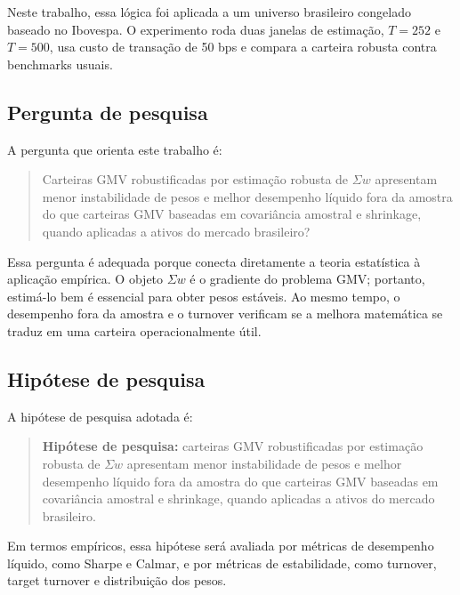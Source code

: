 \documentclass[12pt,a4paper]{article}
\begin{document}
\begin{center}
\end{center}

Neste trabalho, essa lógica foi aplicada a um universo brasileiro congelado baseado no
Ibovespa. O experimento roda duas janelas de estimação, $T=252$ e $T=500$, usa custo de
transação de 50 bps e compara a carteira robusta contra benchmarks usuais.

\subsection{Pergunta de pesquisa}

A pergunta que orienta este trabalho é:

\begin{quote}
Carteiras GMV robustificadas por estimação robusta de $\Sigma w$ apresentam menor
instabilidade de pesos e melhor desempenho líquido fora da amostra do que carteiras GMV
baseadas em covariância amostral e shrinkage, quando aplicadas a ativos do mercado brasileiro?
\end{quote}

Essa pergunta é adequada porque conecta diretamente a teoria estatística à aplicação empírica.
O objeto $\Sigma w$ é o gradiente do problema GMV; portanto, estimá-lo bem é essencial para
obter pesos estáveis. Ao mesmo tempo, o desempenho fora da amostra e o turnover verificam se a
melhora matemática se traduz em uma carteira operacionalmente útil.

\subsection{Hipótese de pesquisa}

A hipótese de pesquisa adotada é:

\begin{quote}
\textbf{Hipótese de pesquisa:} carteiras GMV robustificadas por estimação robusta de
$\Sigma w$ apresentam menor instabilidade de pesos e melhor desempenho líquido fora da amostra
do que carteiras GMV baseadas em covariância amostral e shrinkage, quando aplicadas a ativos
do mercado brasileiro.
\end{quote}

Em termos empíricos, essa hipótese será avaliada por métricas de desempenho líquido, como
Sharpe e Calmar, e por métricas de estabilidade, como turnover, target turnover e distribuição
dos pesos.
\end{document}

